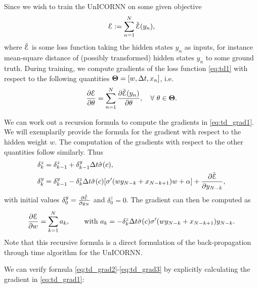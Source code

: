\documentclass{article}
\newcommand{\Dt}{{\Delta t}}
\newcommand{\E}{\EuScript{E}}
\begin{document}
Since we wish to train the UnICORNN on some given objective
\begin{equation}
\label{eq:td1}
\E := \sum\limits_{n=1}^N \Tilde{\E}(y_n),
\end{equation}
where $\Tilde{\E}$ is some loss function taking the hidden states $y_n$ as inputs, for instance mean-square distance of (possibly transformed) hidden states $y_n$ to some ground truth. During training, we compute gradients of the loss function \eqref{eq:td1} with respect to the following quantities ${\bf \Theta} = [w,\Dt,x_n]$, i.e.
\begin{equation}
\label{eq:td_grad1}
\frac{\partial \E}{\partial \theta} = \sum_{n=1}^N \frac{\partial \Tilde{\E}(y_n)}{\partial \theta}, \quad \forall ~\theta \in {\bf \Theta}.
\end{equation}

We can work out a recursion formula to compute the gradients in \eqref{eq:td_grad1}. We will exemplarily provide the formula for the gradient with respect to the hidden weight $w$. The computation of the gradients with respect to the other quantities follow similarly. 
Thus
\begin{align}
\label{eq:td_grad2}
\delta^z_k &= \delta^z_{k-1} + \delta^y_{k-1}\Dt\hat{\sigma}(c), \\
\delta^y_k &= \delta^y_{k-1} - \delta^z_{k}\Dt\hat{\sigma}(c)[\sigma^\prime(wy_{N-k} + x_{N-k+1})w + \alpha] + \frac{\partial \Tilde{\E}}{\partial y_{N-k}}, 
\end{align}
with initial values $\delta^y_0 = \frac{\partial \Tilde{\E}}{\partial y_{N}}$ and $\delta^z_0 = 0$.
The gradient can then be computed as
\begin{equation}
\label{eq:td_grad3}
    \frac{\partial \E}{\partial w} = \sum_{k=1}^{N} a_k, \qquad \text{with } a_k= -\delta^z_{k}\Dt\hat{\sigma}(c)\sigma^\prime(wy_{N-k} + x_{N-k+1})y_{N-k}.
\end{equation}
Note that this recursive formula is a direct formulation of the back-propagation through time algorithm \citep{bptt} for the UnICORNN. 

We can verify formula \eqref{eq:td_grad2}-\eqref{eq:td_grad3} by explicitly calculating the gradient in \eqref{eq:td_grad1}:
\end{document}
